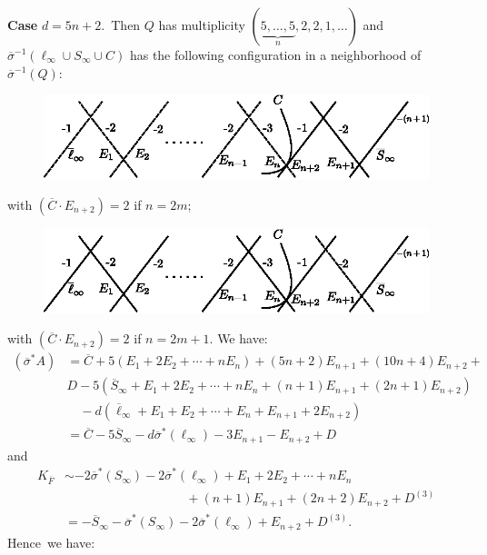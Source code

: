\subsubsection{}\label{chap3:3.5.2}
{\bf Case} $d=5n+2$.\pageoriginale\ Then $Q$ has multiplicity
$(\underbrace{5,\ldots,5}_{n},2,2,1,\ldots)$ and
$\overline{\sigma}^{-1}(\ell_{\infty}\cup S_{\infty}\cup C)$ has the
following configuration in a neighborhood of
$\overline{\sigma}^{-1}(Q)$:
\begin{figure}[H]
\centering
\includegraphics[scale=1.1]{figures/miyansi_fig38.eps}
\end{figure}
\noindent
with $(\overline{C}\cdot E_{n+2})=2$ if $n=2m$;
\begin{figure}[H]
\centering
\includegraphics[scale=1.1]{figures/miyansi_fig39.eps}
\end{figure}
\noindent
with $(\overline{C}\cdot E_{n+2})=2$ if $n=2m+1$. We have:
\begin{align*}
(\overline{\sigma}^{\ast}A) &=
  \overline{C}+5(E_{1}+2E_{2}+\cdots+nE_{n})+(5n+2)E_{n+1}+(10n+4)E_{n+2}+\\ 
  & D-5(\overline{S}_{\infty}+E_{1}+2E_{2} + \cdots+ nE_{n}+ (n+1)
  E_{n+1}+ (2n+1)E_{n+2})\\ 
&\quad
  -d(\overline{\ell}_{\infty}+E_{1}+E_{2}+\cdots+E_{n}+E_{n+1}+2E_{n+2})\\
&=
  \overline{C}-5\overline{S}_{\infty}-d\overline{\sigma}^{\ast}(\ell_{\infty})-3E_{n+1}-E_{n+2}+D 
\end{align*}
and
\begin{align*}
  K_{\overline{F}} &\sim
  -2\overline{\sigma}^{\ast}(S_{\infty})-2\overline{\sigma}^{\ast}
  (\ell_{\infty}) + E_{1}+ 2E_{2}+\cdots+nE_{n}\\
  & \hspace{4cm}+(n+1)E_{n+1} +(2n+2)E_{n+2}+D^{(3)}\\
  &= -\overline{S}_{\infty}-\overline{\sigma}^{\ast} (S_{\infty}) - 2
  \overline{\sigma}^{\ast}(\ell_{\infty})+E_{n+2}+D^{(3)}. 
\end{align*}
Hence\pageoriginale\  we have:

